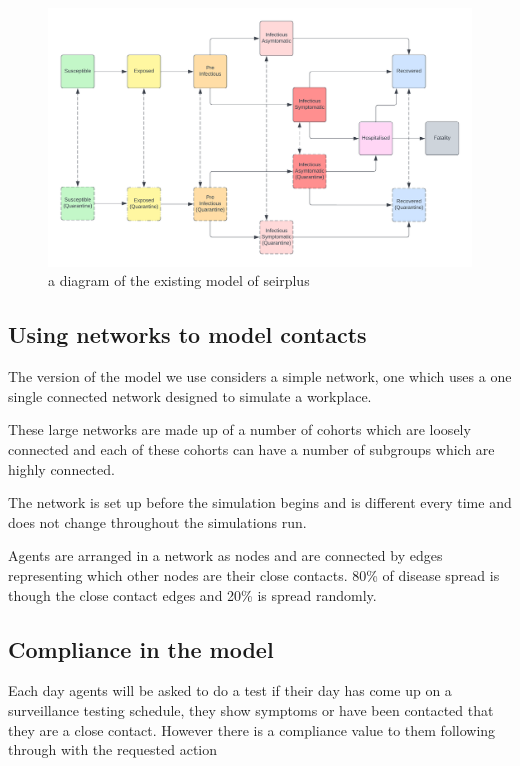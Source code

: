 \documentclass{article}
\begin{document}
\begin{figure}
\centering
\includegraphics[width=\textwidth]{SIR}
\caption{a diagram of the existing model of seirplus ~\cite{mcgee_2021}}
\end{figure}

\newpage



\subsection{Using networks to model contacts}

The version of the model we use considers a simple network, one which uses a one single connected network designed to simulate a workplace.

These large networks are made up of a number of cohorts which are loosely connected and each of these cohorts can have a number of subgroups which are highly connected.

The network is set up before the simulation begins and is different every time and does not change throughout the simulations run. 

Agents are arranged in a network as nodes and are connected by edges representing which other nodes are their close contacts. 80\% of disease spread is though the close contact edges and 20\% is spread randomly.

\subsection{Compliance in the model}
Each day agents will be asked to do a test if their day has come up on a surveillance testing schedule, they show symptoms or have been contacted that they are a close contact. However there is a compliance value to them following through with the requested action
\end{document}

